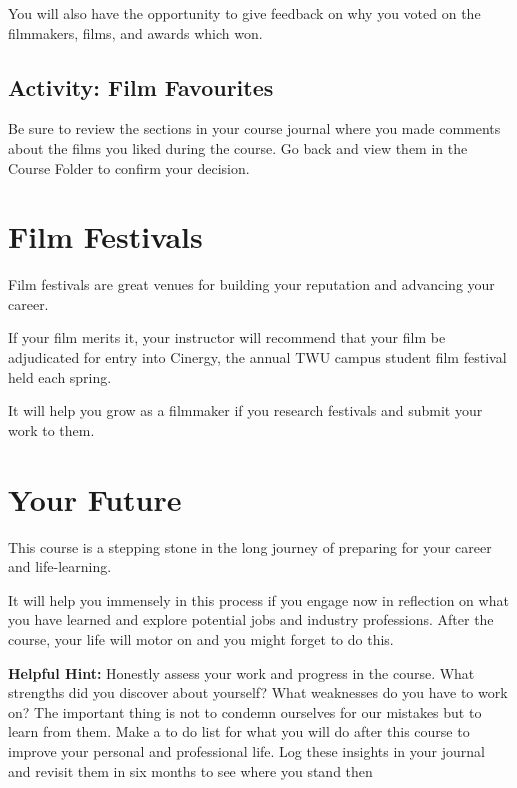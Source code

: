 \documentclass[
  letterpaper,
  DIV=11,
  numbers=noendperiod]{scrreprt}
\begin{document}
You will also have the opportunity to give feedback on why you voted on
the filmmakers, films, and awards which won.

\subsection{Activity: Film Favourites}\label{activity-film-favourites}

\begin{tcolorbox}[enhanced jigsaw, titlerule=0mm, leftrule=.75mm, bottomrule=.15mm, colback=white, left=2mm, opacitybacktitle=0.6, title={Learning Activity}, colbacktitle=quarto-callout-note-color!10!white, colframe=quarto-callout-note-color-frame, bottomtitle=1mm, toptitle=1mm, opacityback=0, rightrule=.15mm, breakable, arc=.35mm, toprule=.15mm, coltitle=black]

Be sure to review the sections in your course journal where you made
comments about the films you liked during the course. Go back and view
them in the Course Folder to confirm your decision.

\end{tcolorbox}

\section{Film Festivals}\label{film-festivals}

Film festivals are great venues for building your reputation and
advancing your career.

If your film merits it, your instructor will recommend that your film be
adjudicated for entry into Cinergy, the annual TWU campus student film
festival held each spring.

It will help you grow as a filmmaker if you research festivals and
submit your work to them.

\section{Your Future}\label{your-future}

This course is a stepping stone in the long journey of preparing for
your career and life-learning.

It will help you immensely in this process if you engage now in
reflection on what you have learned and explore potential jobs and
industry professions. After the course, your life will motor on and you
might forget to do this.

\textbf{Helpful Hint:} Honestly assess your work and progress in the
course. What strengths did you discover about yourself? What weaknesses
do you have to work on? The important thing is not to condemn ourselves
for our mistakes but to learn from them. Make a to do list for what you
will do after this course to improve your personal and professional
life. Log these insights in your journal and revisit them in six months
to see where you stand then
\end{document}

